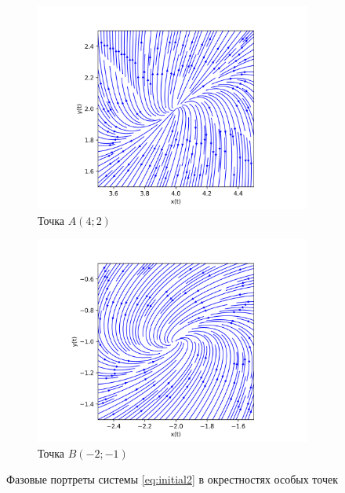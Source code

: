 \documentclass{article}
\begin{document}
\begin{figure}[h!]
    \centering
    \begin{subfigure}{0.4\textwidth}
        \includegraphics[width=\textwidth]{graph2_A.png}
        \caption{\;Точка $A(4;2)$}
        \label{fig:subfigureA}
    \end{subfigure}
    \begin{subfigure}{0.4\textwidth}
        \includegraphics[width=\textwidth]{graph2_B.png}
        \caption{\;Точка $B(-2;-1)$}
        \label{fig:subfigureB}
    \end{subfigure}
    
    \hfill
    \caption{Фазовые портреты системы \ref{eq:initial2} в окрестностях особых точек} 
    \label{fig:combined_graph}
\end{figure}
\end{document}
